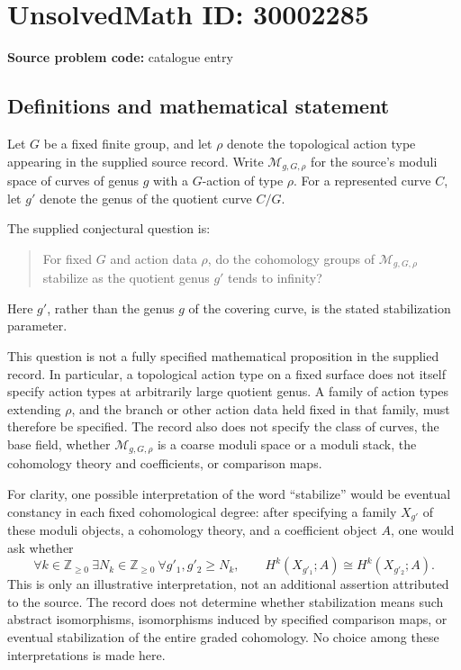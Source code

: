 \documentclass[11pt]{article}
\newcommand{\Z}{\mathbb{Z}}
\begin{document}
\section*{UnsolvedMath ID: 30002285}
\textbf{Source problem code:} catalogue entry
\subsection{Definitions and mathematical statement}
Let \(G\) be a fixed finite group, and let \(\rho\) denote the topological action type appearing in the supplied source record. Write \(\mathcal M_{g,G,\rho}\) for the source's moduli space of curves of genus \(g\) with a \(G\)-action of type \(\rho\). For a represented curve \(C\), let \(g'\) denote the genus of the quotient curve \(C/G\).

The supplied conjectural question is:
\begin{quote}
For fixed \(G\) and action data \(\rho\), do the cohomology groups of \(\mathcal M_{g,G,\rho}\) stabilize as the quotient genus \(g'\) tends to infinity?
\end{quote}
Here \(g'\), rather than the genus \(g\) of the covering curve, is the stated stabilization parameter.

This question is not a fully specified mathematical proposition in the supplied record. In particular, a topological action type on a fixed surface does not itself specify action types at arbitrarily large quotient genus. A family of action types extending \(\rho\), and the branch or other action data held fixed in that family, must therefore be specified. The record also does not specify the class of curves, the base field, whether \(\mathcal M_{g,G,\rho}\) is a coarse moduli space or a moduli stack, the cohomology theory and coefficients, or comparison maps.

For clarity, one possible interpretation of the word ``stabilize'' would be eventual constancy in each fixed cohomological degree: after specifying a family \(X_{g'}\) of these moduli objects, a cohomology theory, and a coefficient object \(A\), one would ask whether
\[
\forall k\in\Z_{\geq 0}\ \exists N_k\in\Z_{\geq 0}\ \forall g'_1,g'_2\geq N_k,
\qquad H^k(X_{g'_1};A)\cong H^k(X_{g'_2};A).
\]
This is only an illustrative interpretation, not an additional assertion attributed to the source. The record does not determine whether stabilization means such abstract isomorphisms, isomorphisms induced by specified comparison maps, or eventual stabilization of the entire graded cohomology. No choice among these interpretations is made here.
\end{document}
